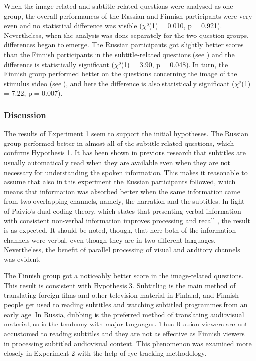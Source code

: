\documentclass[output=paper]{langsci/langscibook}
\begin{document}
When the image-related and subtitle-related questions were analysed as one group, the overall performances of the Russian and Finnish participants were very even and no statistical difference was visible ($\chi $²(1) = 0.010, p = 0.921). Nevertheless, when the analysis was done separately for the two question groups, differences began to emerge. The Russian participants got slightly better scores than the Finnish participants in the subtitle-related questions (see ) and the difference is statistically significant ($\chi $²(1) = 3.90, p = 0.048).  In turn, the Finnish group performed better on the questions concerning the image of the stimulus video (see ), and here the difference is also statistically significant ($\chi $²(1) = 7.22, p = 0.007).

\subsubsection{Discussion}

The results of Experiment 1 seem to support the initial hypotheses. The Russian group performed better in almost all of the subtitle-related questions, which confirms Hypothesis 1. It has been shown in previous research \citep{dydewalle1987} that subtitles are usually automatically read when they are available even when they are not necessary for understanding the spoken information. This makes it reasonable to assume that also in this experiment the Russian participants followed, which means that information was absorbed better when the same information came from two overlapping channels, namely, the narration and the subtitles. In light of Paivio's dual-coding theory, which states that presenting verbal information with consistent non-verbal information improves processing and recall \citep{Paivio1986}, the result is as expected. It should be noted, though, that here both of the information channels were verbal, even though they are in two different languages. Nevertheless, the benefit of parallel processing of visual and auditory channels was evident. 

The Finnish group got a noticeably better score in the image-related questions. This result is consistent with Hypothesis 3. Subtitling is the main method of translating foreign films and other television material in Finland, and Finnish people get used to reading subtitles and watching subtitled programmes from an early age. In Russia, dubbing is the preferred method of translating audiovisual material, as is the tendency with major languages. Thus Russian viewers are not accustomed to reading subtitles and they are not as effective as Finnish viewers in processing subtitled audiovisual content. This phenomenon was examined more closely in Experiment 2 with the help of eye tracking methodology.
\end{document}
